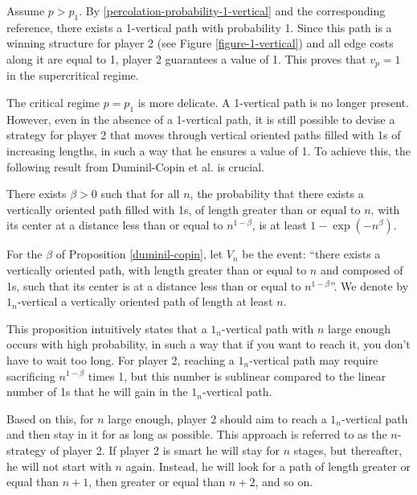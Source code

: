         Assume $p > p_1$. By \eqref{percolation-probability-1-vertical} and the corresponding reference, there exists a 1-vertical path with probability 1. Since this path is a winning structure for player 2 (see Figure \ref{figure-1-vertical}) and all edge costs along it are equal to 1, player 2 guarantees a value of 1. This proves that $v_p =  1$ in the supercritical regime. 

        The critical regime $p = p_1$ is more delicate. A 1-vertical path is no longer present. However, even in the absence of a 1-vertical path, it is still possible to devise a strategy for player 2 that moves through vertical oriented paths filled with 1s of increasing lengths, in such a way that he ensures a value of 1. To achieve this, the following result from Duminil-Copin et al. \cite{DuminilCopin18} is crucial. 

        \begin{proposition}\label{duminil-copin}
            There exists $\beta > 0$ such that for all $n$, the probability that there exists a vertically oriented path filled with 1s, of length greater than or equal to $n$, with its center at a distance less than or equal to $n^{1-\beta}$, is at least $1 - \exp(-n^{\beta})$. 
        \end{proposition} 
        
        For the $\beta$ of Proposition \ref{duminil-copin}, let $V_n$ be the event: ``there exists a vertically oriented path, with length greater than or equal to $n$ and composed of 1s, such that its center is at a distance less than or equal to $n^{1-\beta}$''. We denote by $1_n$-vertical a vertically oriented path of length at least $n$. 

        This proposition intuitively states that a $1_n$-vertical path with $n$ large enough occurs with high probability, in such a way that if you want to reach it, you don't have to wait too long. For player 2, reaching a $1_n$-vertical path may require sacrificing $n^{1-\beta}$ times 1, but this number is sublinear compared to the linear number of 1s that he will gain in the $1_n$-vertical path. 

        Based on this, for $n$ large enough, player 2 should aim to reach a $1_n$-vertical path and then stay in it for as long as possible. This approach is referred to as the $n$-strategy of player 2. If player 2 is smart he will stay for $n$ stages, but thereafter, he will not start with $n$ again. Instead, he will look for a path of length greater or equal than $n+1$, then greater or equal than $n+2$, and so on. 

